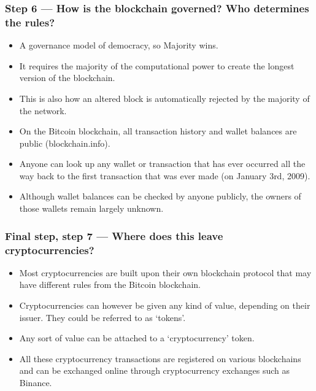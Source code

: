 \begin{frame}[fragile]\frametitle{Step 6 — How is the blockchain governed? Who determines the rules?}
\begin{itemize}
\item A governance model of democracy, so Majority wins.
\item It requires the majority of the computational power to create the longest version of the blockchain. 
\item This is also how an altered block is automatically rejected by the majority of the network.
\item On the Bitcoin blockchain, all transaction history and wallet balances are public (blockchain.info). 
\item Anyone can look up any wallet or transaction that has ever occurred all the way back to the first transaction that was ever made (on January 3rd, 2009). 
\item Although wallet balances can be checked by anyone publicly, the owners of those wallets remain largely unknown.
\end{itemize}


\end{frame}

\begin{frame}[fragile]\frametitle{Final step, step 7 — Where does this leave cryptocurrencies?}
\begin{itemize}
\item Most cryptocurrencies are built upon their own blockchain protocol that may have different rules from the Bitcoin blockchain. 
\item Cryptocurrencies can however be given any kind of value, depending on their issuer. They could be referred to as ‘tokens’. 
\item Any sort of value can be attached to a ‘cryptocurrency’ token. 
\item All these cryptocurrency transactions are registered on various blockchains and can be exchanged online through cryptocurrency exchanges such as Binance. 
\end{itemize}


\end{frame}





